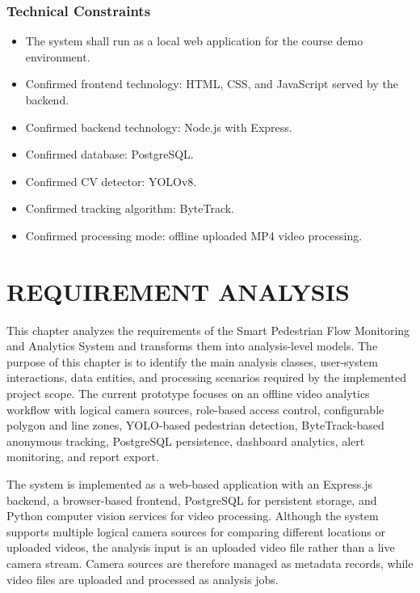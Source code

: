 \documentclass[12pt,a4paper]{report}
\begin{document}
\subsection*{Technical Constraints}
\begin{itemize}
    \item The system shall run as a local web application for the course demo environment.
    \item Confirmed frontend technology: HTML, CSS, and JavaScript served by the backend.
    \item Confirmed backend technology: Node.js with Express.
    \item Confirmed database: PostgreSQL.
    \item Confirmed CV detector: YOLOv8.
    \item Confirmed tracking algorithm: ByteTrack.
    \item Confirmed processing mode: offline uploaded MP4 video processing.
\end{itemize}

\chapter{REQUIREMENT ANALYSIS}
\label{chap:requirement-analysis}

This chapter analyzes the requirements of the Smart Pedestrian Flow Monitoring and Analytics System and transforms them into analysis-level models.
The purpose of this chapter is to identify the main analysis classes, user-system interactions, data entities, and processing scenarios required by the implemented project scope.
The current prototype focuses on an offline video analytics workflow with logical camera sources, role-based access control, configurable polygon and line zones, YOLO-based pedestrian detection, ByteTrack-based anonymous tracking, PostgreSQL persistence, dashboard analytics, alert monitoring, and report export.

The system is implemented as a web-based application with an Express.js backend, a browser-based frontend, PostgreSQL for persistent storage, and Python computer vision services for video processing.
Although the system supports multiple logical camera sources for comparing different locations or uploaded videos, the analysis input is an uploaded video file rather than a live camera stream.
Camera sources are therefore managed as metadata records, while video files are uploaded and processed as analysis jobs.
\end{document}

